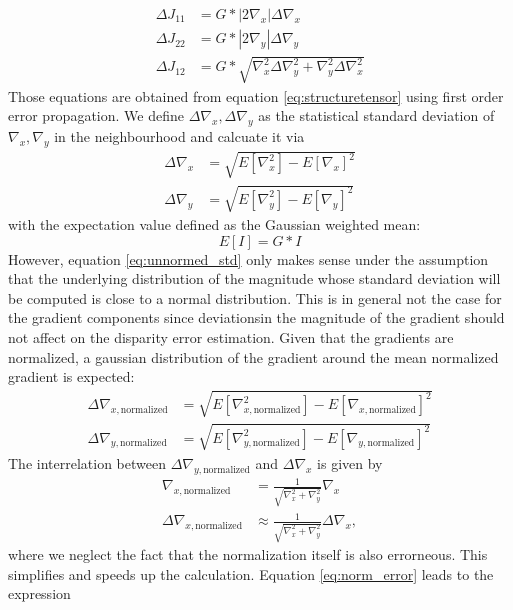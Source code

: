 \documentclass  [
  paper    = a4,
  BCOR     = 10mm,
  twoside,
  fontsize = 12pt,
  fleqn,
  toc      = bibnumbered,
  toc      = listofnumbered,
  numbers  = noendperiod,
  headings = normal,
  listof   = leveldown,
  version  = 3.03
]                                       {scrreprt}
\begin{document}
 \begin{align}\label{eq:std_struct}
 \Delta J_{11} &= G *|2\nabla_x|\Delta\nabla_x\\
 \Delta J_{22} &= G *|2\nabla_y|\Delta\nabla_y\\
 \Delta J_{12} &= G *\sqrt{\nabla_x^2\Delta\nabla_y^2 + \nabla_y^2\Delta\nabla_x^2}
 \end{align}
 Those equations are obtained from equation \ref{eq:structuretensor} using first order error propagation. We define $\Delta\nabla_x , \Delta\nabla_y$ as the statistical standard deviation of $\nabla_x, \nabla_y$ in the neighbourhood and calcuate it via
 \begin{align}\label{eq:unnormed_std}
 \Delta\nabla_x &= \sqrt{E[\nabla_x^2] - E[\nabla_x]^2}\\
 \Delta\nabla_y &= \sqrt{E[\nabla_y^2] - E[\nabla_y]^2}
 \end{align}
 with the expectation value defined as the Gaussian weighted mean:
 \begin{equation}\label{key}
 E[I] = G* I
 \end{equation}
 However, equation \ref{eq:unnormed_std} only makes sense under the assumption that the underlying distribution of the magnitude whose standard deviation will be computed is close to a normal distribution. This is in general not  the case for the gradient components since deviationsin the magnitude of the gradient should not affect on the disparity error estimation. Given that the gradients are normalized, a gaussian distribution of the gradient around the mean normalized gradient is expected: 
 \begin{align}\label{eq:normed_std}
 \Delta\nabla_{x, \text{normalized}} &= \sqrt{E[\nabla_{x, \text{normalized}}^2] - E[\nabla_{x, \text{normalized}}]^2}\\
 \Delta\nabla_{y, \text{normalized}} &= \sqrt{E[\nabla_{y, \text{normalized}}^2] - E[\nabla_{y, \text{normalized}}]^2}
 \end{align}
 The interrelation between $\Delta\nabla_{y, \text{normalized}}$ and  $\Delta\nabla_x$ is given by
 \begin{align}\label{eq:norm_error}
 \nabla_{x, \text{normalized}} &= \frac{1}{\sqrt{\nabla_x^2 + \nabla_y^2}}\nabla_x \\
 \Delta \nabla_{x, \text{normalized}} &\approx  \frac{1}{\sqrt{\nabla_x^2 + \nabla_y^2}}\Delta\nabla_x,
 \end{align}
 where we neglect the fact that the normalization itself is also errorneous. This simplifies and speeds up the calculation. Equation \ref{eq:norm_error} leads to the expression
\end{document}
